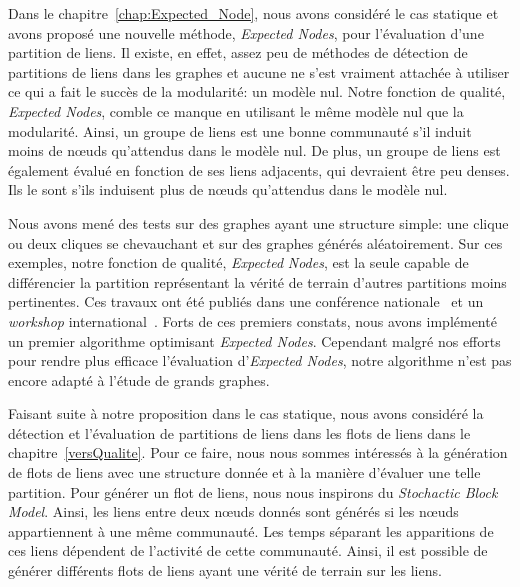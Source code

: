 \bigskip

Dans le chapitre~\ref{chap:Expected_Node}, nous avons considéré le cas statique et avons proposé une nouvelle méthode, \emph{Expected Nodes}, pour l'évaluation d'une partition de liens.
Il existe, en effet, assez peu de méthodes de détection de partitions de liens dans les graphes et aucune ne s'est vraiment attachée à utiliser ce qui a fait le succès de la modularité: un modèle nul.
Notre fonction de qualité, \emph{Expected Nodes}, comble ce manque en utilisant le même modèle nul que la modularité.
Ainsi, un groupe de liens est une bonne communauté s'il induit moins de n\oe{}uds qu'attendus dans le modèle nul.
De plus, un groupe de liens est également évalué en fonction de ses liens adjacents, qui devraient être peu denses.
Ils le sont s'ils induisent plus de n\oe{}uds qu'attendus dans le modèle nul.

\bigskip

Nous avons mené des tests sur des graphes ayant une structure simple: une clique ou deux cliques se chevauchant et sur des graphes générés aléatoirement.
Sur ces exemples, notre fonction de qualité, \emph{Expected} \emph{Nodes}, est la seule capable de différencier la partition représentant la vérité de terrain d'autres partitions moins pertinentes.
Ces travaux ont été publiés dans une conférence nationale~\cite{Gaumont2014} et un \emph{workshop} international~\cite{Gaumont2015}.
Forts de ces premiers constats, nous avons implémenté un premier algorithme optimisant \emph{Expected Nodes}.
Cependant malgré nos efforts pour rendre plus efficace l'évaluation d'\emph{Expected Nodes}, notre algorithme n'est pas encore adapté à l'étude de grands graphes.

\bigskip

Faisant suite à notre proposition dans le cas statique, nous avons considéré la détection et l'évaluation de partitions de liens dans les flots de liens dans le chapitre~\ref{versQualite}.
Pour ce faire, nous nous sommes intéressés à la génération de flots de liens avec une structure donnée et à la manière d'évaluer une telle partition.
Pour générer un flot de liens, nous nous inspirons du \emph{Stochactic Block Model}.
Ainsi, les liens entre deux n\oe{}uds donnés sont générés si les n\oe{}uds appartiennent à une même communauté.
Les temps séparant les apparitions de ces liens dépendent de l'activité de cette communauté.
Ainsi, il est possible de générer différents flots de liens ayant une vérité de terrain sur les liens.

\bigskip

